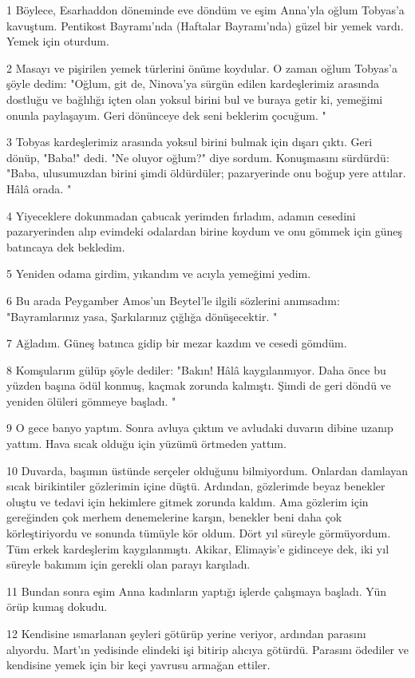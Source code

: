 \par 1 Böylece, Esarhaddon döneminde eve döndüm ve eşim Anna'yla oğlum Tobyas'a kavuştum. Pentikost Bayramı'nda (Haftalar Bayramı'nda) güzel bir yemek vardı. Yemek için oturdum.
\par 2 Masayı ve pişirilen yemek türlerini önüme koydular. O zaman oğlum Tobyas'a şöyle dedim: "Oğlum, git de, Ninova'ya sürgün edilen kardeşlerimiz arasında dostluğu ve bağlılığı içten olan yoksul birini bul ve buraya getir ki, yemeğimi onunla paylaşayım. Geri dönünceye dek seni beklerim çocuğum. "
\par 3 Tobyas kardeşlerimiz arasında yoksul birini bulmak için dışarı çıktı. Geri dönüp, "Baba!" dedi. "Ne oluyor oğlum?" diye sordum. Konuşmasını sürdürdü: "Baba, ulusumuzdan birini şimdi öldürdüler; pazaryerinde onu boğup yere attılar. Hâlâ orada. "
\par 4 Yiyeceklere dokunmadan çabucak yerimden fırladım, adamın cesedini pazaryerinden alıp evimdeki odalardan birine koydum ve onu gömmek için güneş batıncaya dek bekledim.
\par 5 Yeniden odama girdim, yıkandım ve acıyla yemeğimi yedim.
\par 6 Bu arada Peygamber Amos'un Beytel'le ilgili sözlerini anımsadım: "Bayramlarınız yasa, Şarkılarınız çığlığa dönüşecektir. "
\par 7 Ağladım. Güneş batınca gidip bir mezar kazdım ve cesedi gömdüm.
\par 8 Komşularım gülüp şöyle dediler: "Bakın! Hâlâ kaygılanmıyor. Daha önce bu yüzden başına ödül konmuş, kaçmak zorunda kalmıştı. Şimdi de geri döndü ve yeniden ölüleri gömmeye başladı. "
\par 9 O gece banyo yaptım. Sonra avluya çıktım ve avludaki duvarın dibine uzanıp yattım. Hava sıcak olduğu için yüzümü örtmeden yattım.
\par 10 Duvarda, başımın üstünde serçeler olduğunu bilmiyordum. Onlardan damlayan sıcak birikintiler gözlerimin içine düştü. Ardından, gözlerimde beyaz benekler oluştu ve tedavi için hekimlere gitmek zorunda kaldım. Ama gözlerim için gereğinden çok merhem denemelerine karşın, benekler beni daha çok körleştiriyordu ve sonunda tümüyle kör oldum. Dört yıl süreyle görmüyordum. Tüm erkek kardeşlerim kaygılanmıştı. Akikar, Elimayis'e gidinceye dek, iki yıl süreyle bakımım için gerekli olan parayı karşıladı.
\par 11 Bundan sonra eşim Anna kadınların yaptığı işlerde çalışmaya başladı. Yün örüp kumaş dokudu.
\par 12 Kendisine ısmarlanan şeyleri götürüp yerine veriyor, ardından parasını alıyordu. Mart'ın yedisinde elindeki işi bitirip alıcıya götürdü. Parasını ödediler ve kendisine yemek için bir keçi yavrusu armağan ettiler.
